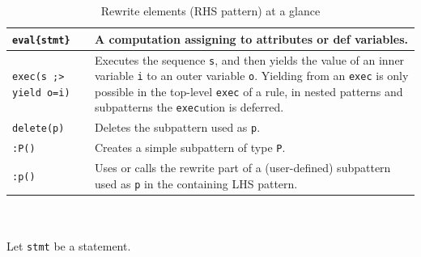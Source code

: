 \begin{table}[htbp]
\begin{minipage}{\linewidth}
\begin{tabularx}{\linewidth}{|lX|}
\hline
\texttt{eval\{stmt\}} & A computation assigning to attributes or def variables.\\
\hline
\texttt{exec(s ;> yield o=i)} & Executes the sequence \texttt{s}, and then yields the value of an inner variable \texttt{i} to an outer variable \texttt{o}. Yielding from an \texttt{exec} is only possible in the top-level \texttt{exec} of a rule, in nested patterns and subpatterns the \texttt{exec}ution is deferred.\\
\hline
\texttt{delete(p)} & Deletes the subpattern used as \texttt{p}.\\
\texttt{:P()} & Creates a simple subpattern of type \texttt{P}.\\
\texttt{:p()} & Uses or calls the rewrite part of a (user-defined) subpattern used as \texttt{p} in the containing LHS pattern.\\
\hline
\end{tabularx}
\end{minipage}\\
\\ 
{\small Let \texttt{stmt} be a statement.}
\caption{Rewrite elements (RHS pattern) at a glance}
\label{rewritestab}
\end{table}

